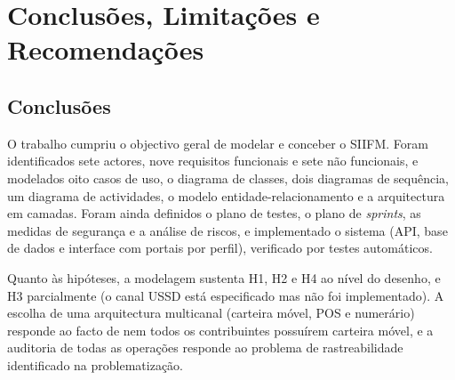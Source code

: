 \documentclass[12pt,a4paper,openany]{report}
\begin{document}
\chapter{Conclusões, Limitações e Recomendações}

\section{Conclusões}
O trabalho cumpriu o objectivo geral de modelar e conceber o SIIFM. Foram identificados sete actores, nove requisitos funcionais e sete não funcionais, e modelados oito casos de uso, o diagrama de classes, dois diagramas de sequência, um diagrama de actividades, o modelo entidade-relacionamento e a arquitectura em camadas. Foram ainda definidos o plano de testes, o plano de \emph{sprints}, as medidas de segurança e a análise de riscos, e implementado o sistema (API, base de dados e interface com portais por perfil), verificado por testes automáticos.

Quanto às hipóteses, a modelagem sustenta H1, H2 e H4 ao nível do desenho, e H3 parcialmente (o canal USSD está especificado mas não foi implementado). A escolha de uma arquitectura multicanal (carteira móvel, POS e numerário) responde ao facto de nem todos os contribuintes possuírem carteira móvel, e a auditoria de todas as operações responde ao problema de rastreabilidade identificado na problematização.
\end{document}
